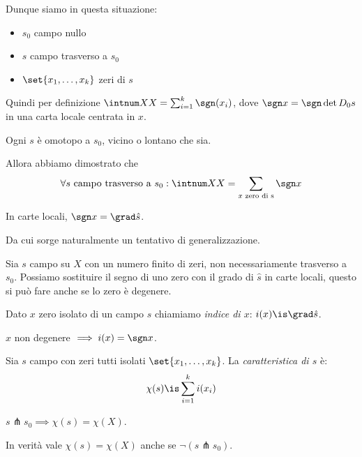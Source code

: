\noindent Dunque siamo in questa situazione:
\begin{itemize}
	\item $s_0$ campo nullo
	\item $s$ campo trasverso a $s_0$
	\item $\set{x_1,\dots,x_k}$ zeri di $s$
\end{itemize}
Quindi per definizione $\intnum XX=\sum_{i=1}^k\sgn(x_i)$, dove $\sgn x=\sgn\det D_0s$ in una carta locale centrata in $x$.

\begin{oss}
	Ogni $s$ è omotopo a $s_0$, vicino o lontano che sia.
\end{oss}

\noindent Allora abbiamo dimostrato che
\[\forall s\text{ campo trasverso a }s_0:\intnum XX=\sum_{x\text{ zero di s}}\sgn x\]

\begin{oss}
	In carte locali, $\sgn x=\grad\hat s$\footnotemark.
\end{oss}

\noindent Da cui sorge naturalmente un tentativo di generalizzazione.

Sia $s$ campo su $X$ con un numero finito di zeri, non necessariamente trasverso a $s_0$.
Possiamo sostituire il segno di uno zero con il grado di $\hat s$ in carte locali, questo si può fare anche se lo zero è degenere.

\begin{defn}
	Dato $x$ zero isolato di un campo $s$ chiamiamo \emph{indice di $x$}: $i(x)\is\grad\hat s$.
\end{defn}

\begin{oss}
	$x$ non degenere $\implies i(x)=\sgn x$.
\end{oss}

\begin{defn}
	Sia $s$ campo con zeri tutti isolati $\set{x_1,\dots,x_k}$. La \emph{caratteristica di $s$} è:
	\[\chi(s)\is\sum_{i=1}^ki(x_i)\]
\end{defn}

\begin{oss}
	$s\pitchfork s_0\implies\chi(s)=\chi(X)$.
\end{oss}

\begin{teo}[di Hopf]
	In verità vale $\chi(s)=\chi(X)$ anche se $\neg(s\pitchfork s_0)$.
\end{teo}

